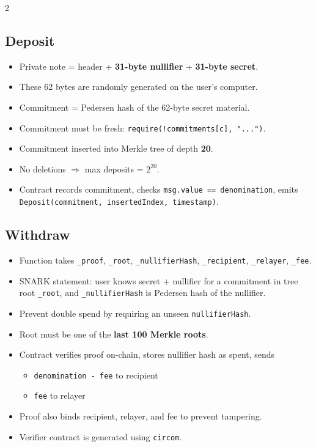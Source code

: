 \documentclass[10pt,a4paper]{article}
\newcommand{\code}[1]{\texttt{#1}}
\newcommand{\imp}[1]{\textbf{#1}}
\begin{document}
\begin{multicols*}{2}
\subsection*{Deposit}
\begin{itemize}
\item Private note = header + \imp{31-byte nullifier} + \imp{31-byte secret}.
\item These 62 bytes are randomly generated on the user's computer.
\item Commitment = Pedersen hash of the 62-byte secret material.
\item Commitment must be fresh: \code{require(!commitments[c], "...")}.
\item Commitment inserted into Merkle tree of depth \imp{20}.
\item No deletions $\Rightarrow$ max deposits = \imp{$2^{20}$}.
\item Contract records commitment, checks \code{msg.value == denomination}, emits \code{Deposit(commitment, insertedIndex, timestamp)}.
\end{itemize}

\subsection*{Withdraw}
\begin{itemize}
\item Function takes \code{_proof}, \code{_root}, \code{_nullifierHash}, \code{_recipient}, \code{_relayer}, \code{_fee}.
\item SNARK statement: user knows secret + nullifier for a commitment in tree root \code{_root}, and \code{_nullifierHash} is Pedersen hash of the nullifier.
\item Prevent double spend by requiring an unseen \code{nullifierHash}.
\item Root must be one of the \imp{last 100 Merkle roots}.
\item Contract verifies proof on-chain, stores nullifier hash as spent, sends
\begin{itemize}
\item \code{denomination - fee} to recipient
\item \code{fee} to relayer
\end{itemize}
\item Proof also binds recipient, relayer, and fee to prevent tampering.
\item Verifier contract is generated using \code{circom}.
\end{itemize}


\end{multicols*}
\end{document}
